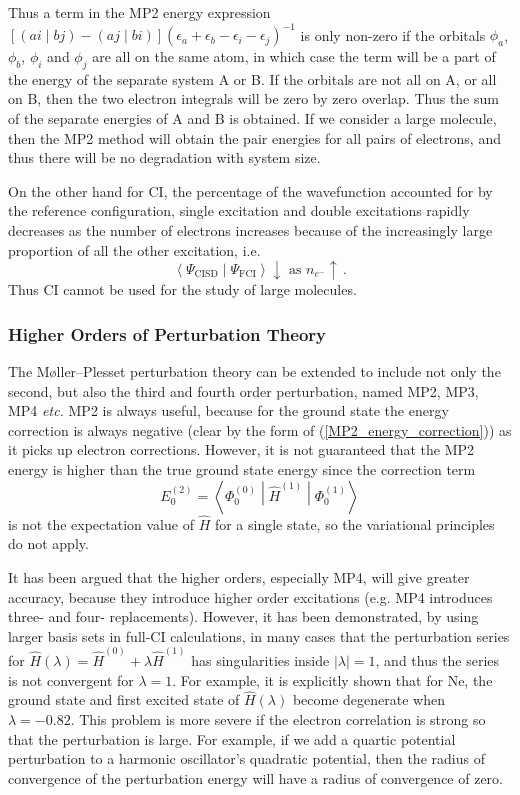 \documentclass{article}
\theoremstyle{plain}\theoremheaderfont{\normalfont\itshape}\theorembodyfont{\rmfamily}\theoremseparator{.}\newtheorem*{rem}{Remark}\newtheorem*{ex}{Example}\newtheorem*{proof}{Proof}\newtheorem*{altp}{Alternative proof}
\theoremstyle{plain}\theoremheaderfont{\normalfont\bfseries}\theorembodyfont{\rmfamily}\theoremseparator{.}\newtheorem{thm}{Theorem}[section]\newtheorem{lem}[thm]{Lemma}\newtheorem{prop}[thm]{Proposition}\newtheorem*{cor}{Corollary}\newtheorem{defn}[thm]{Definition}\newtheorem{clm}[thm]{Claim}\newtheorem{clminproof}{Claim}
\theoremstyle{break}\theoremheaderfont{\normalfont\itshape}\theorembodyfont{\rmfamily}\theoremseparator{.\medskip}\newtheorem*{proofskip}{Proof}\newtheorem*{exs}{Examples}\newtheorem*{rems}{Remarks}
\theoremstyle{break}\theoremheaderfont{\normalfont\bfseries}\theorembodyfont{\rmfamily}\theoremseparator{.\medskip}\newtheorem{lemskip}[thm]{Lemma}\newtheorem{defnskip}[thm]{Definition}\newtheorem{propskip}[thm]{Proposition}\newtheorem{thmskip}[thm]{Theorem}
\numberwithin{equation}{section}
\newcommand{\braket}[2]{\left\langle #1 \middle| #2 \right\rangle}
\newcommand{\mel}[3]{\left\langle #1 \middle| #2 \middle| #3 \right\rangle}
\newcommand{\abs}[1]{\left| #1 \right|}
\newcommand{\bracket}[2]{\left( #1 \middle| #2 \right)}
\begin{document}
    Thus a term in the MP2 energy expression \([\bracket{ai}{bj}-\bracket{aj}{bi}](\epsilon_a+\epsilon_b-\epsilon_i-\epsilon_j)^{-1}\) is only non-zero if the orbitals \(\phi_a\), \(\phi_b\), \(\phi_i\) and \(\phi_j\) are all on the same atom, in which case the term will be a part of the energy of the separate system A or B. If the orbitals are not all on A, or all on B, then the two electron integrals will be zero by zero overlap. Thus the sum of the separate energies of A and B is obtained. If we consider a large molecule, then the MP2 method will obtain the pair energies for all pairs of electrons, and thus there will be no degradation with system size.

    On the other hand for CI, the percentage of the wavefunction accounted for by the reference configuration, single excitation and double excitations rapidly decreases as the number of electrons increases because of the increasingly large proportion of all the other excitation, i.e.
    \begin{equation}
        \braket{\Psi_{\text{CISD}}}{\Psi_{\text{FCI}}}\downarrow\text{ as }n_{e^-}\uparrow\,.
    \end{equation}
    Thus CI cannot be used for the study of large molecules.

    \subsubsection{Higher Orders of Perturbation Theory}
    The M\o ller--Plesset perturbation theory can be extended to include not only the second, but also the third and fourth order perturbation, named MP2, MP3, MP4 \textit{etc.} MP2 is always useful, because for the ground state the energy correction is always negative (clear by the form of (\ref{MP2_energy_correction})) as it picks up electron corrections. However, it is not guaranteed that the MP2 energy is higher than the true ground state energy since the correction term
    \begin{equation}
        E_0^{(2)}=\mel{\Phi_0^{(0)}}{\hat{H}^{(1)}}{\Phi_0^{(1)}}
    \end{equation}  
    is not the expectation value of \(\hat{H}\) for a single state, so the variational principles do not apply.

    It has been argued that the higher orders, especially MP4, will give greater accuracy, because they introduce higher order excitations (e.g. MP4 introduces three- and four- replacements). However, it has been demonstrated, by using larger basis sets in full-CI calculations, in many cases that the perturbation series for \(\hat{H}(\lambda)=\hat{H}^{(0)}+\lambda\hat{H}^{(1)}\) has singularities inside \(\abs{\lambda}=1\), and thus the series is not convergent for \(\lambda=1\). For example, it is explicitly shown that for Ne, the ground state and first excited state of \(\hat{H}(\lambda)\) become degenerate when \(\lambda=-0.82\). This problem is more severe if the electron correlation is strong so that the perturbation is large. For example, if we add a quartic potential perturbation to a harmonic oscillator's quadratic potential, then the radius of convergence of the perturbation energy will have a radius of convergence of zero.
\end{document}
